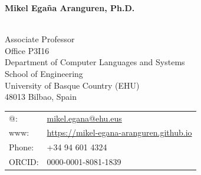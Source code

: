 \documentclass[11pt,fullpage]{article}
\newcommand{\etc}{\emph{etc.}}
\def\name{Mikel Ega\~na Aranguren, Ph.D.}
\begin{document}


\centerline{\Large \bf \name}

\vspace{0.25in}

\begin{minipage}{0.50\linewidth}
~\\
Associate Professor \\




  Office P3I16 \\ 
  Department of Computer Languages and Systems \\
  School of Engineering \\
  University of Basque Country (EHU) \\
  48013 Bilbao, Spain \\


\end{minipage}
\begin{minipage}{0.50\linewidth}
  \begin{tabular}{ll}
    @: 
& \href{mailto:mikel.egana@ehu.eus}{mikel.egana@ehu.eus} \\
    www: & \href{https://mikel-egana-aranguren.github.io}{https://mikel-egana-aranguren.github.io} \\
    Phone: & +34 94 601 4324 \\
    ORCID: & 0000-0001-8081-1839 \\

  \end{tabular}
\end{minipage}


\end{document}
